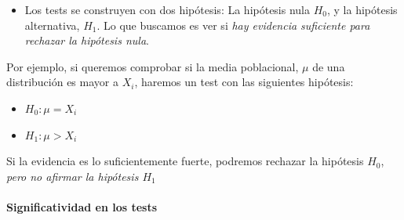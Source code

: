 \documentclass[]{book}
\providecommand{\tightlist}{%
  \setlength{\itemsep}{0pt}\setlength{\parskip}{0pt}}
\let\oldparagraph\paragraph
\renewcommand{\paragraph}[1]{\oldparagraph{#1}\mbox{}}
\begin{document}
\begin{itemize}
\tightlist
\item
  Los tests se construyen con dos hipótesis: La hipótesis nula \(H_0\), y la hipótesis alternativa, \(H_1\). Lo que buscamos es ver si \emph{hay evidencia suficiente para rechazar la hipótesis nula}.
\end{itemize}

Por ejemplo, si queremos comprobar si la media poblacional, \(\mu\) de una distribución es mayor a \(X_i\), haremos un test con las siguientes hipótesis:

\begin{itemize}
\tightlist
\item
  \(H_0: \mu = X_i\)
\item
  \(H_1: \mu > X_i\)
\end{itemize}

Si la evidencia es lo suficientemente fuerte, podremos rechazar la hipótesis \(H_0\), \emph{pero no afirmar la hipótesis \(H_1\)}

\hypertarget{significatividad-en-los-tests}{%
\paragraph{Significatividad en los tests}\label{significatividad-en-los-tests}}
\end{document}
